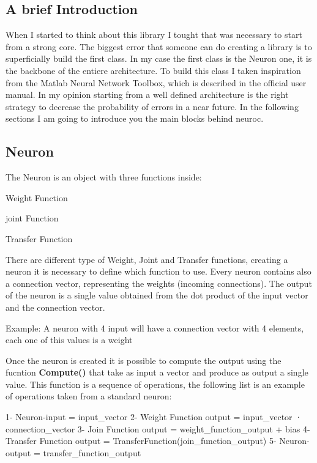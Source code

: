 \subsection*{A brief Introduction }

When I started to think about this library I tought that was necessary to start from a strong core. The biggest error that someone can do creating a library is to superficially build the first class. In my case the first class is the Neuron one, it is the backbone of the entiere architecture. To build this class I taken inspiration from the Matlab Neural Network Toolbox, which is described in the official user manual. In my opinion starting from a well defined architecture is the right strategy to decrease the probability of errors in a near future. In the following sections I am going to introduce you the main blocks behind neuroc.

\subsection*{Neuron }

The Neuron is an object with three functions inside\-:


\begin{DoxyEnumerate}
\item Weight Function
\item joint Function
\item Transfer Function
\end{DoxyEnumerate}

There are different type of Weight, Joint and Transfer functions, creating a neuron it is necessary to define which function to use. Every neuron contains also a connection vector, representing the weights (incoming connections). The output of the neuron is a single value obtained from the dot product of the input vector and the connection vector.

Example\-: A neuron with 4 input will have a connection vector with 4 elements, each one of this values is a weight

Once the neuron is created it is possible to compute the output using the fucntion {\bfseries Compute()} that take as input a vector and produce as output a single value. This function is a sequence of operations, the following list is an example of operations taken from a standard neuron\-:

1-\/ Neuron-\/input = input\-\_\-vector 2-\/ Weight Function output = input\-\_\-vector · connection\-\_\-vector 3-\/ Join Function output = weight\-\_\-function\-\_\-output + bias 4-\/ Transfer Function output = Transfer\-Function(join\-\_\-function\-\_\-output) 5-\/ Neuron-\/output = transfer\-\_\-function\-\_\-output

